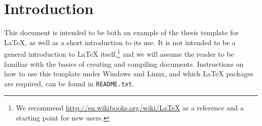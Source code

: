 \chapter{Introduction}
\label{chapter_1}

\noindent This document is intended to be both an example of the thesis template for \LaTeX, as well as a short introduction to its use. It is not intended to be a general introduction to \LaTeX{} itself,\footnote{We recommend \url{http://en.wikibooks.org/wiki/LaTeX} as a reference and a starting point for new users.} and we will assume the reader to be familiar with the basics of creating and compiling documents. Instructions on how to use this template under Windows and Linux, and which \LaTeX{} packages are required, can be found in \texttt{README.txt}.
